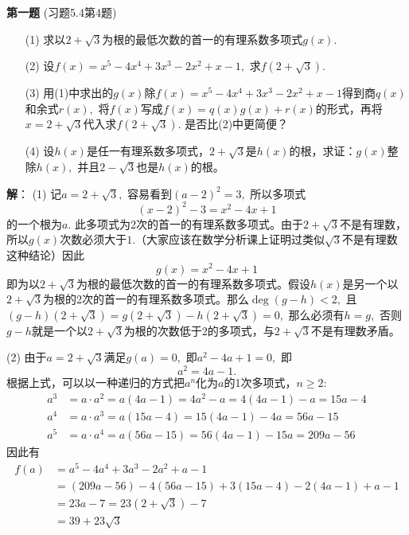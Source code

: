 
\usepackage{polynom}

\date{2022-12-2 第七次习题课}
\author{}



\maketitle

\ifLargeLayout
\larger[2]
\fi

{\bf 第一题} (习题5.4第4题)
\begin{itemize}
\item[(1)] 求以$2 + \sqrt{3}$为根的最低次数的首一的有理系数多项式$g(x).$
\item[(2)] 设$f(x) = x^5 - 4x^4 + 3x^3 - 2x^2 + x - 1,$ 求$f(2 + \sqrt{3}).$
\item[(3)] 用(1)中求出的$g(x)$除$f(x) = x^5 - 4x^4 + 3x^3 - 2x^2 + x - 1$得到商$q(x)$和余式$r(x),$ 将$f(x)$写成$f(x) = q(x) g(x) + r(x)$的形式，再将$x = 2 + \sqrt{3}$代入求$f(2 + \sqrt{3}).$ 是否比(2)中更简便？
\item[(4)] 设$h(x)$是任一有理系数多项式，$2 + \sqrt{3}$是$h(x)$的根，求证：$g(x)$整除$h(x),$ 并且$2 - \sqrt{3}$也是$h(x)$的根。
\end{itemize}

\ifIncludeAnswer

\newpageorvspace

{\bf 解}： (1) 记$a = 2 + \sqrt{3},$ 容易看到$(a - 2)^2 = 3,$ 所以多项式
$$(x - 2)^2 - 3 = x^2 - 4x + 1$$
的一个根为$a.$ 此多项式为2次的首一的有理系数多项式。由于$2 + \sqrt{3}$不是有理数，所以$g(x)$次数必须大于$1.$（大家应该在数学分析课上证明过类似$\sqrt{3}$不是有理数这种结论）因此
$$g(x) = x^2 - 4x + 1$$
即为以$2 + \sqrt{3}$为根的最低次数的首一的有理系数多项式。假设$h(x)$是另一个以$2 + \sqrt{3}$为根的2次的首一的有理系数多项式。那么$\deg (g - h) < 2,$ 且$(g - h)(2 + \sqrt{3}) = g(2 + \sqrt{3}) - h(2 + \sqrt{3}) = 0,$ 那么必须有$h = g,$ 否则$g - h$就是一个以$2 + \sqrt{3}$为根的次数低于2的多项式，与$2 + \sqrt{3}$不是有理数矛盾。

\vspace{0.5em}

(2) 由于$a = 2 + \sqrt{3}$满足$g(a) = 0,$ 即$a^2 - 4a + 1 = 0,$ 即
$$a^2 = 4a - 1.$$
根据上式，可以以一种递归的方式把$a^n$化为$a$的1次多项式，$n\geqslant 2:$
\begin{align*}
a^3 & = a \cdot a^2 = a(4a - 1) = 4a^2 - a = 4(4a - 1) - a = 15a - 4 \\
a^4 & = a \cdot a^3 = a(15a - 4) = 15(4a - 1) - 4a = 56a - 15 \\
a^5 & = a \cdot a^4 = a(56a - 15) = 56(4a - 1) - 15a = 209a - 56
\end{align*}
因此有
\begin{align*}
f(a) & = a^5 - 4a^4 + 3a^3 - 2a^2 + a - 1 \\
& = (209a - 56) - 4(56a - 15) + 3(15a - 4) - 2(4a - 1) + a - 1 \\
& = 23a - 7 = 23(2 + \sqrt{3}) - 7 \\
& = 39 + 23\sqrt{3}
\end{align*}

